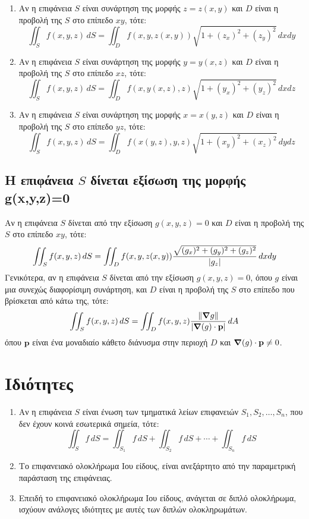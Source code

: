 \begin{enumerate}
  \item Αν η επιφάνεια $S$ είναι συνάρτηση της μορφής $ z=z(x,y) $ και $D$ είναι η 
    προβολή της $S$ στο επίπεδο $ xy $, τότε: 
    \[
      \iint_{S} f(x,y,z) \,{dS} = \iint_{D} f(x,y,z(x,y)) \sqrt{1+(z_{x})^{2}+
      (z_{y})^{2}} \,{dx}{dy} 
    \] 

  \item Αν η επιφάνεια $S$ είναι συνάρτηση της μορφής $ y=y(x,z) $ και $D$ είναι η 
    προβολή της $S$ στο επίπεδο $ xz $, τότε: 
    \[
      \iint_{S} f(x,y,z) \,{dS} = \iint_{D} f(x,y(x,z),z) \sqrt{1+(y_{x})^{2}+
      (y_{z})^{2}} \,{dx}{dz} 
    \] 
  \item Αν η επιφάνεια $S$ είναι συνάρτηση της μορφής $ x=x(y,z) $ και $D$ είναι η 
    προβολή της $S$ στο επίπεδο $ yz $, τότε: 
    \[
      \iint_{S} f(x,y,z) \,{dS} = \iint_{D} f(x(y,z),y,z) \sqrt{1+(x_{y})^{2}+
      (x_{z})^{2}} \,{dy}{dz} 
    \] 
\end{enumerate}

\subsection*{Η επιφάνεια $S$ δίνεται εξίσωση της μορφής g(x,y,z)=0}

Αν η επιφάνεια $S$ δίνεται από την εξίσωση $ g(x,y,z) = 0 $ και $D$ είναι η προβολή της 
$S$ στο επίπεδο $ xy $, τότε:
\[
  \iint_{S} f(x,y,z) \,{dS} = \iint_{D} f(x,y,z(x,y)) \frac{\sqrt{(g_{x})^{2}+
  (g_{y})^{2}+(g_{z})^{2}}}{\abs{g_{z}}} \,{dx}{dy} 
\]
Γενικότερα, αν η επιφάνεια $S$ δίνεται από την εξίσωση $ g(x,y,z) = 0 $, όπου $ g
$ είναι μια συνεχώς διαφορίσιμη συνάρτηση, 
και $D$ είναι η προβολή της $S$ στο επίπεδο που βρίσκεται από κάτω της, τότε:
\[
  \iint_{S} f(x,y,z) \,{dS} = \iint_{D} f(x,y,z)
  \frac{\norm{\grad{g}}}{\abs{\grad(g) \cdot \mathbf{p}}} \,{dA} 
\]
όπου $ \mathbf{p} $ είναι ένα μοναδιαίο κάθετο διάνυσμα στην περιοχή $D$ και $
\grad(g)\cdot \mathbf{p} \neq 0 $.  


\section{Ιδιότητες}

\begin{enumerate}
  \item Αν η επιφάνεια $S$ είναι ένωση των τμηματικά λείων επιφανειών $ S_{1}, S_{2},
    \ldots, S_{n} $, που δεν έχουν κοινά εσωτερικά σημεία, τότε:
    \[
      \iint_{S} f \,{dS} = \iint_{S_{1}} f \,{dS} + \iint_{S_{2}} f \,{dS} +
      \cdots + \iint_{S_{n}} f \,{dS} 
    \] 
  \item Το επιφανειακό ολοκλήρωμα Ιου είδους, είναι ανεξάρτητο από την παραμετρική
    παράσταση της επιφάνειας.
  \item Επειδή το επιφανειακό ολοκλήρωμα Ιου είδους, ανάγεται σε διπλό ολοκλήρωμα, 
    ισχύουν ανάλογες ιδιότητες με αυτές των διπλών ολοκληρωμάτων.
\end{enumerate}

